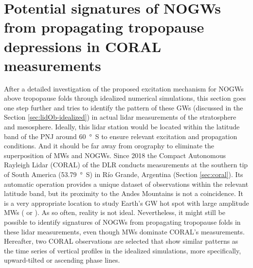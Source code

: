 \section{Potential signatures of NOGWs from propagating tropopause depressions in CORAL measurements}
\label{sec:lidOb-coral}
%
After a detailed investigation of the proposed excitation mechanism for NOGWs above tropopause folds through idealized numerical simulations, this section goes one step further and tries to identify the pattern of these GWs (discussed in the Section \ref{sec:lidOb-idealized}) in actual lidar measurements of the stratosphere and mesosphere. Ideally, this lidar station would be located within the latitude band of the PNJ around \SI{60}{\degree S} to ensure relevant excitation and propagation conditions. And it should be far away from orography to eliminate the superposition of MWs and NOGWs. Since 2018 the Compact Autonomous Rayleigh Lidar (CORAL) of the DLR conducts measurements at the southern tip of South America (\SI{53.79}{\degree S}) in Río Grande, Argentina (Section \ref{sec:coral}). Its automatic operation provides a unique dataset of observations within the relevant latitude band, but its proximity to the Andes Mountains is not a coincidence. It is a very appropriate location to study Earth's GW hot spot with large amplitude MWs (\cite[]{rapp_et_al_southtrac-gw_2021} or \cite[]{reichert_highcadence_2021}). As so often, reality is not ideal. Nevertheless, it might still be possible to identify signatures of NOGWs from propagating tropopause folds in these lidar measurements, even though MWs dominate CORAL's measurements. Hereafter, two CORAL observations are selected that show similar patterns as the time series of vertical profiles in the idealized simulations, more specifically, upward-tilted or ascending phase lines. 

